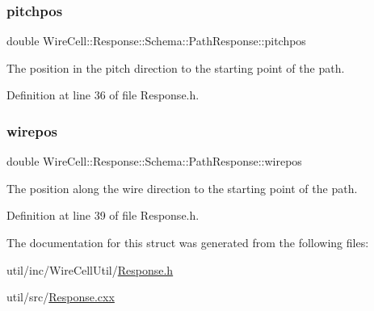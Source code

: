 \subsubsection{\texorpdfstring{pitchpos}{pitchpos}}
{\footnotesize\ttfamily double Wire\+Cell\+::\+Response\+::\+Schema\+::\+Path\+Response\+::pitchpos}



The position in the pitch direction to the starting point of the path. 



Definition at line 36 of file Response.\+h.

\mbox{\label{struct_wire_cell_1_1_response_1_1_schema_1_1_path_response_ad1beaec9fa3131397c5c19b9ce2a9282}} 
\subsubsection{\texorpdfstring{wirepos}{wirepos}}
{\footnotesize\ttfamily double Wire\+Cell\+::\+Response\+::\+Schema\+::\+Path\+Response\+::wirepos}



The position along the wire direction to the starting point of the path. 



Definition at line 39 of file Response.\+h.



The documentation for this struct was generated from the following files\+:\begin{DoxyCompactItemize}
\item 
util/inc/\+Wire\+Cell\+Util/\hyperlink{_response_8h}{Response.\+h}\item 
util/src/\hyperlink{_response_8cxx}{Response.\+cxx}\end{DoxyCompactItemize}
